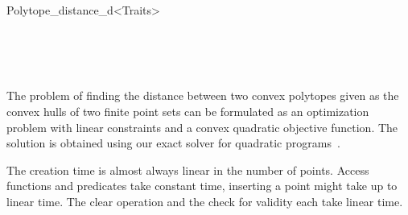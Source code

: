 \begin{ccRefClass}{Polytope_distance_d<Traits>}
\begin{ccIndexGlobalFunctions}


\end{ccIndexGlobalFunctions}

\ccSeeAlso

\\
\\
\\[1ex]

\ccImplementation
\ccIndexImplementation

The problem of finding the distance between two convex polytopes given as
the convex hulls of two finite point sets can be formulated as an
optimization problem with linear constraints and a convex quadratic
objective function. The solution is obtained using our exact solver
for quadratic programs~\cite{gs-eegqp-00}.

The creation time is almost always linear in the number of points.  Access
functions and predicates take constant time, inserting a point might take
up to linear time.  The clear operation and the check for validity each
take linear time.


\ccRestoreThreeColumns

\end{ccRefClass}

